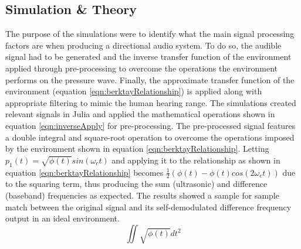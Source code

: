 \documentclass[final,32pt]{beamer}
\begin{document}
\begin{frame}[t]
\begin{multicols}{3}
\section{Simulation \& Theory}
The purpose of the simulations were to identify what the main signal processing factors are when producing a directional audio system. To do so, the audible signal had to be generated and the inverse transfer function of the environment applied through pre-processing to overcome the operations the environment performs on the pressure wave. Finally, the approximate transfer function of the environment (equation \ref{eqn:berktayRelationship}) is applied along with appropriate filtering to mimic the human hearing range. The simulations created relevant signals in Julia and applied the mathematical operations shown in equation \ref{eqn:inverseApply} for pre-processing. The pre-processed signal features a double integral and square-root operation to overcome the operations imposed by the environment shown in equation \ref{eqn:berktayRelationship}. Letting $p_1(t) = \sqrt{\phi(t)}sin(\omega_c t)$ and applying it to the relationship as shown in equation \ref{eqn:berktayRelationship} becomes $\frac{1}{2} \left(\phi(t)-\phi(t)cos(2\omega_c t) \right)$ due to the squaring term, thus producing the sum (ultrasonic) and difference (baseband) frequencies as expected. The results showed a sample for sample match between the original signal and its self-demodulated difference frequency output in an ideal environment.
\begin{equation}
        \iint \sqrt{\phi(t)} dt^2
        \label{eqn:inverseApply}
\end{equation}

\end{multicols}
\end{frame}
\end{document}
